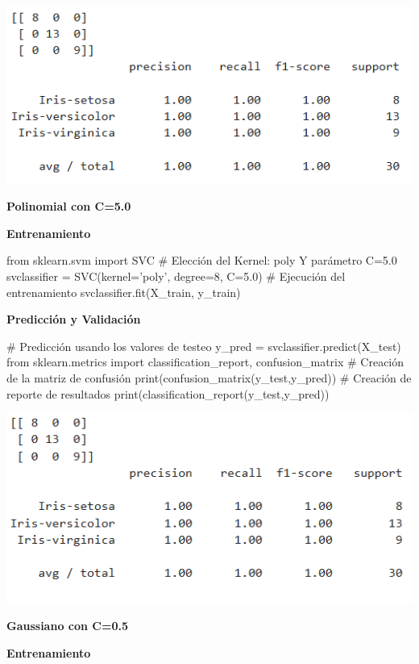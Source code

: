 \documentclass[paper=a4, fontsize=11pt]{scrartcl}
\numberwithin{equation}{section}		%
\numberwithin{figure}{section}			%
\numberwithin{table}{section}				%
\begin{document}
    \includegraphics[scale=0.8]{polynomial_c_20}
    \newpage
    
    \textbf{Polinomial con C=5.0}
    
    \textbf{Entrenamiento}
    
    \begin{python}
    from sklearn.svm import SVC
    # Elección del Kernel: poly Y parámetro C=5.0
    svclassifier = SVC(kernel='poly', degree=8, C=5.0)
    # Ejecución del entrenamiento
    svclassifier.fit(X_train, y_train)
    \end{python}
    
    \textbf{Predicción y Validación}
    
    \begin{python}
    # Predicción usando los valores de testeo
    y_pred = svclassifier.predict(X_test)
    from sklearn.metrics import classification_report, confusion_matrix
    # Creación de la matriz de confusión
    print(confusion_matrix(y_test,y_pred))
    # Creación de reporte de resultados
    print(classification_report(y_test,y_pred))
    \end{python}
    
    \includegraphics[scale=0.8]{polynomial_c_50}
    \newpage
    
    \textbf{Gaussiano con C=0.5}
    
    \textbf{Entrenamiento}
    
\end{document}

